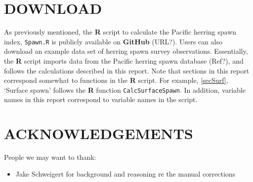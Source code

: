 \documentclass[12pt]{article}
\begin{document}
\section{DOWNLOAD}\label{secDown}

As previously mentioned, the \textbf{R} script to calculate the Pacific herring spawn index, \texttt{Spawn.R} is publicly available on \textbf{GitHub} (URL?).
Users can also download an example data set of herring spawn survey observations.
Essentially, the \textbf{R} script imports data from the Pacific herring spawn database (Ref?), and follows the calculations described in this report.
Note that sections in this report correspond somewhat to functions in the \textbf{R} script.
For example, \autoref{secSurf}, `Surface spawn' follows the \textbf{R} function \texttt{CalcSurfaceSpawn}.
In addition, variable names in this report correspond to variable names in the script.

\section{ACKNOWLEDGEMENTS}

People we may want to thank:
\begin{itemize}
\item Jake Schweigert for background and reasoning re the manual corrections
\end{itemize}



\end{document}
